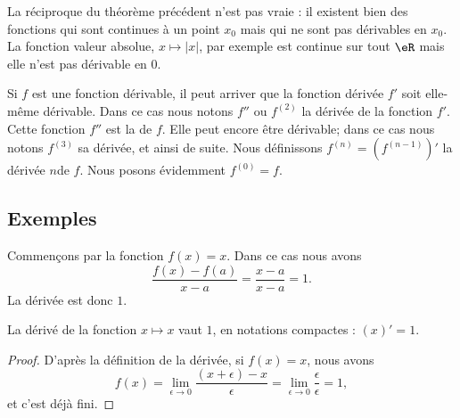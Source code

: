\begin{remark}
     La réciproque du théorème précédent n'est pas vraie : il existent bien des fonctions qui sont continues à un point $x_0$ mais qui ne sont pas dérivables en $x_0$. La fonction valeur absolue, $x\mapsto |x|$, par exemple est continue sur tout $\eR$ mais elle n'est pas dérivable en $0$.
\end{remark}

Si \( f\) est une fonction dérivable, il peut arriver que la fonction dérivée \( f'\) soit elle-même dérivable. Dans ce cas nous notons \( f''\) ou \( f^{(2)}\) la dérivée de la fonction \( f'\). Cette fonction $f''$ est la  de \( f\). Elle peut encore être dérivable; dans ce cas nous notons \( f^{(3)}\) sa dérivée, et ainsi de suite. Nous définissons \( f^{(n)}=(f^{(n-1)})'\) la dérivée \( n\)\ieme de \( f\). Nous posons évidemment $f^{(0)}=f$.

\subsection{Exemples}

\begin{example}
    Commençons par la fonction $f(x)=x$. Dans ce cas nous avons
    \begin{equation}
        \frac{ f(x)-f(a) }{ x-a }=\frac{ x-a }{ x-a }=1.
    \end{equation}
    La dérivée est donc $1$.
\end{example}

\begin{proposition}
    La dérivé de la fonction $x\mapsto x$ vaut $1$, en notations compactes : $(x)'=1$.
\end{proposition}

\begin{proof}
    D'après la définition de la dérivée, si $f(x)=x$, nous avons
    \begin{equation}
        f(x)=\lim_{\epsilon\to 0}\frac{ (x+\epsilon) -x }{\epsilon} =\lim_{\epsilon\to 0}\frac{ \epsilon }{\epsilon} =1,
    \end{equation}
    et c'est déjà fini.
\end{proof}

